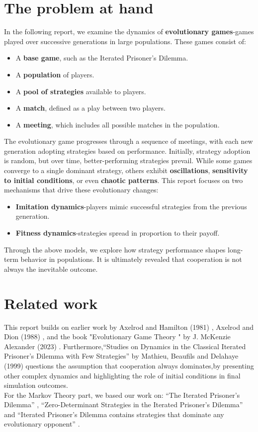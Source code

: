 \documentclass[12pt]{report}
\begin{document}
\section{The problem at hand}
In the following report, we examine the dynamics of \textbf{evolutionary games}-games played over successive generations in large populations. These games consist of:
\begin{itemize}
    \item A \textbf{base game}, such as the Iterated Prisoner's Dilemma.
    \item A \textbf{population} of players.
    \item A \textbf{pool of strategies} available to players.
    \item A \textbf{match}, defined as a play between two players.
    \item A \textbf{meeting}, which includes all possible matches in the population.
\end{itemize}
The evolutionary game progresses through a sequence of meetings, with each new generation adopting strategies based on performance. Initially, strategy adoption is random, but over time, better-performing strategies prevail. While some games converge to a single dominant strategy, others exhibit \textbf{oscillations}, \textbf{sensitivity to initial conditions}, or even \textbf{chaotic patterns}.
This report focuses on two mechanisms that drive these evolutionary changes:
\begin{itemize}
    \item \textbf{Imitation dynamics}-players mimic successful strategies from the previous generation.
    \item \textbf{Fitness dynamics}-strategies spread in proportion to their payoff.
\end{itemize}
Through the above models, we explore how strategy performance shapes long-term behavior in populations. It is ultimately revealed that cooperation is not always the inevitable outcome.
\section{Related work}
This report builds on earlier work by Axelrod and Hamilton (1981) \cite{axelrod1981}, Axelrod and Dion (1988) \cite{axelrod1988}, and the book "Evolutionary Game Theory
" by J. McKenzie Alexander (2023) \cite{alexander2023}.
Furthermore,“Studies on Dynamics in the
Classical Iterated Prisoner’s Dilemma with Few Strategies” by Mathieu,  Beaufils and  Delahaye (1999) \cite{mathieu1999} questions the assumption that cooperation always dominates,by presenting other complex dynamics and highlighting the role of initial conditions in final simulation outcomes.\\
For the Markov Theory part, we based our work on: “The Iterated Prisoner's Dilemma” \cite{wolfram}, “Zero-Determinant Strategies in the Iterated Prisoner's Dilemma” \cite{ncategory} and “Iterated Prisoner’s Dilemma contains strategies that dominate any evolutionary opponent” \cite{pressdyson2012}.
\end{document}
